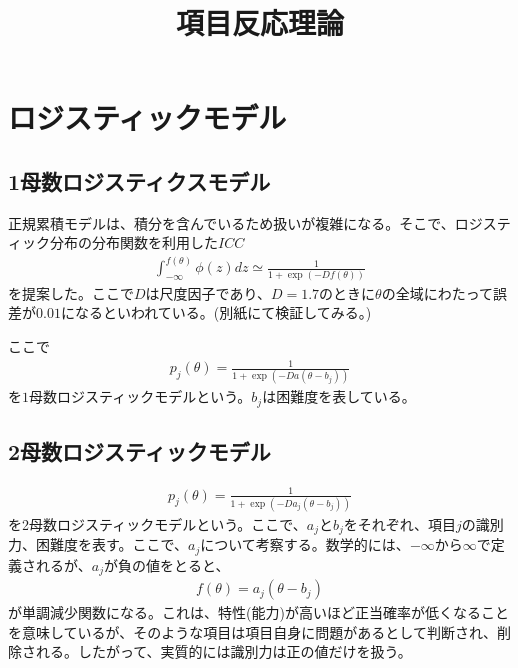 \documentclass[12pt]{jarticle}
\title{項目反応理論}
\begin{document}
\maketitle
\section{ロジスティックモデル}
\subsection{1母数ロジスティクスモデル}
正規累積モデルは、積分を含んでいるため扱いが複雑になる。そこで、ロジスティック分布の分布関数を利用した$ICC$
\begin{eqnarray}
  \label{00}
  \displaystyle \int_{-\infty}^{f(\theta)} \phi(z)dz \simeq \frac{1}{1+\exp(-Df(\theta))}
\end{eqnarray}
を提案した。ここで$D$は尺度因子であり、$D=1.7$のときに$\theta$の全域にわたって誤差が$0.01$になるといわれている。(別紙にて検証してみる。)

ここで
\begin{eqnarray}
  \label{01}
  \displaystyle p_j(\theta) = \frac{1}{1+\exp(-Da(\theta - b_j))}
\end{eqnarray}
を$1$母数ロジスティックモデルという。$b_j$は困難度を表している。
\subsection{2母数ロジスティックモデル}
\begin{eqnarray}
  \label{03}
  \displaystyle p_j(\theta) = \frac{1}{1+\exp(-Da_j(\theta - b_j))}
\end{eqnarray}
を2母数ロジスティックモデルという。ここで、$a_j$と$b_j$をそれぞれ、項目$j$の識別力、困難度を表す。ここで、$a_j$について考察する。数学的には、$-\infty$から$\infty$で定義されるが、$a_j$が負の値をとると、
\begin{eqnarray}
  \displaystyle f(\theta) = a_j(\theta - b_{j})
\end{eqnarray}
が単調減少関数になる。これは、特性(能力)が高いほど正当確率が低くなることを意味しているが、そのような項目は項目自身に問題があるとして判断され、削除される。したがって、実質的には識別力は正の値だけを扱う。
\end{document}
